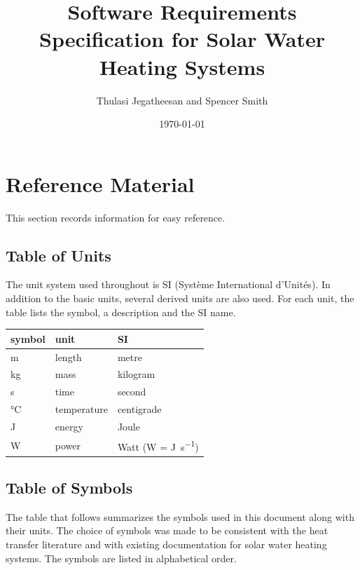 \documentclass[12pt]{article}
\begin{document}
\title{Software Requirements Specification for Solar Water Heating Systems} 
\author{Thulasi Jegatheesan and Spencer Smith}
\date{\today}
	
\maketitle

\tableofcontents

\section{Reference Material}


This section records information for easy reference.

\subsection{Table of Units}

The unit system used throughout is SI (Syst\`{e}me International d'Unit\'{e}s). In addition to the basic units, several derived units are also used. For each unit, the table lists the symbol, a description and the SI name.
~\newline

\renewcommand{\arraystretch}{1.2}
  \noindent \begin{tabular}{l l l} 
    \toprule		
    \textbf{symbol} & \textbf{unit} & \textbf{SI}\\
    \midrule 
    \si{\meter} & length & metre\\
    \si{\kilogram} & mass	& kilogram\\
    \si{\second} & time & second\\
    \si{\celsius} & temperature & centigrade\\
     \si{\joule} & energy & Joule\\
     \si{\watt} & power & Watt (W = \si{\joule\per\second})\\
    \bottomrule
  \end{tabular}

\subsection{Table of Symbols}

The table that follows summarizes the symbols used in this document along with
their units.  The choice of symbols was made to be consistent with the heat
transfer literature and with existing documentation for solar water heating
systems.  The symbols are listed in alphabetical order.
\end{document}
